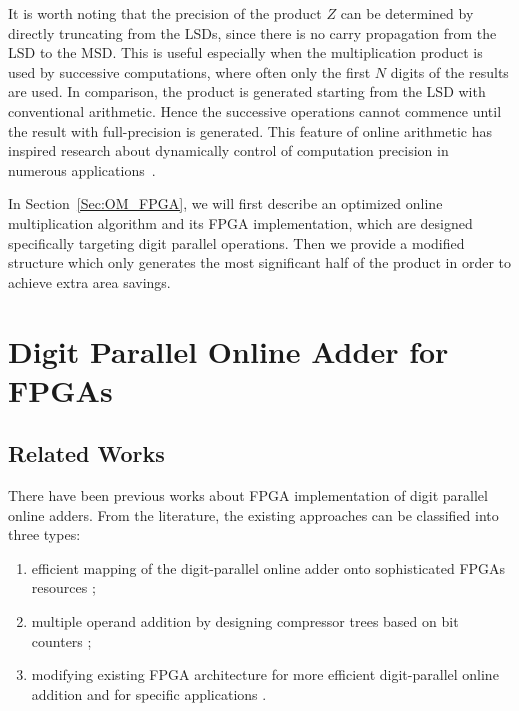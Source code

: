\documentclass[conference]{IEEEtran}
\begin{document}
It is worth noting that the precision of the product $Z$ can be determined by directly truncating from the LSDs, since there is no carry propagation from the LSD to the MSD. This is useful especially when the multiplication product is used by successive computations, where often only the first $N$ digits of the results are used. In comparison, the product is generated starting from the LSD with conventional arithmetic. Hence the successive operations cannot commence until the result with full-precision is generated. This feature of online arithmetic has inspired research about dynamically control of computation precision in numerous applications~\cite{Online_Truncation}.


In Section~\ref{Sec:OM_FPGA}, we will first describe an optimized online multiplication algorithm and its FPGA implementation, which are designed specifically targeting digit parallel operations. Then we provide a modified structure which only generates the most significant half of the product in order to achieve extra area savings.



\section{Digit Parallel Online Adder for FPGAs}\label{Sec:OA_FPGA}
\subsection{Related Works}
There have been previous works about FPGA implementation of digit parallel online adders. From the literature, the existing approaches can be classified into three types:

\begin{enumerate}
    \item efficient mapping of the digit-parallel online adder onto sophisticated FPGAs resources \cite{FPT09RA,ASAP09RA};
    \item multiple operand addition by designing compressor trees based on bit counters \cite{TC13RA,CSMult_CounterArray};
    \item modifying existing FPGA architecture for more efficient digit-parallel online addition \cite{DAC07_CounterTree} and for specific applications \cite{FPL09_onlineCCM}.
\end{enumerate}
\end{document}
